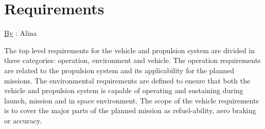 \chapter{Requirements}
\qquad \underline{By} : Alina\\
\label{chap:2}

The top level requirements for the vehicle and propulsion system are divided in three categories: operation, environment and vehicle. The operation requirements are related to the propulsion system and its applicability for the planned missions. The environmental requirements are defined to ensure that both the vehicle and propulsion system is capable of operating and sustaining during launch, mission and in space environment. The scope of the vehicle requirements is to cover the major parts of the planned mission as refuel-ability, aero braking or accuracy. \\
\noindent
